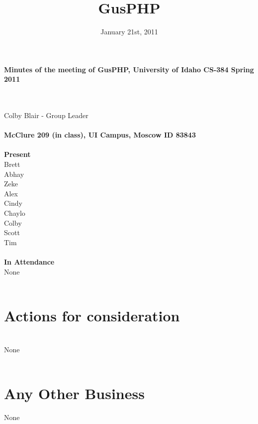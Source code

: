 \documentclass[12pt]{article}
\title{GusPHP}
\date{January 21st, 2011}
\begin{document}
\maketitle
\begin{center}\textbf{Minutes of the meeting of GusPHP, University of Idaho CS-384 Spring 2011} \end{center} \\ 
\\
Colby Blair - Group Leader\\ 
\\
\textbf{McClure 209 (in class), UI Campus, Moscow ID 83843} \\ 
\\
\textbf{Present}\\ 
Brett\\
Abhay\\
Zeke\\
Alex\\
Cindy\\
Chaylo\\
Colby\\
Scott\\
Tim\\
\\
\textbf{In Attendance}\\
None \\
\\
\section{Actions for consideration} \\
None \\
\\
\section{Any Other Business}
None \\
\\
\end{document}
